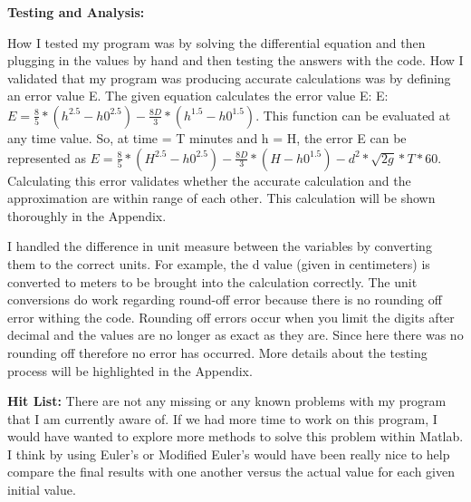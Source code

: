 \documentclass{article}
\begin{document}
{\bf Testing and Analysis:} {\color{black} How I tested my program was by solving the differential equation and then plugging in the values by hand and then testing the answers with the code.  How I validated that my program was producing accurate calculations was by defining an error value E.  The given equation calculates the error value E: E: $E=\frac{8}{5}*(h^{2.5}-h0^{2.5} )-\frac{8D}{3}*(h^{1.5}-h0^{1.5})$.  This function can be evaluated at any time value.  So, at time = T minutes and h = H, the error E can be represented as $E=\frac{8}{5}*(H^{2.5}-h0^{2.5})-\frac{8D}{3}*(H-h0^{1.5} )-d^2*\sqrt{2g}*T*60$.  Calculating this error validates whether the accurate calculation and the approximation are within range of each other.  This calculation will be shown thoroughly in the Appendix.
\par \medskip \par
I handled the difference in unit measure between the variables by converting them to the correct units.  For example, the d value (given in centimeters) is converted to meters to be brought into the calculation correctly.  The unit conversions do work regarding round-off error because  there is no rounding off error withing the code.  Rounding off errors occur when you limit the digits after decimal and the values are no longer as exact as they are. Since here there was no rounding off therefore no error has occurred.  More details about the testing process will be highlighted in the Appendix.
\par \bigskip \par
}

{\bf Hit List: }{\color{black} There are not any missing or any known problems with my program that I am currently aware of.  If we had more time to work on this program, I would have wanted to explore more methods to solve this problem within Matlab.  I think by using Euler’s or Modified Euler’s would have been really nice to help compare the final results with one another versus the actual value for each given initial value.}
\par \bigskip \par

\end{document}
